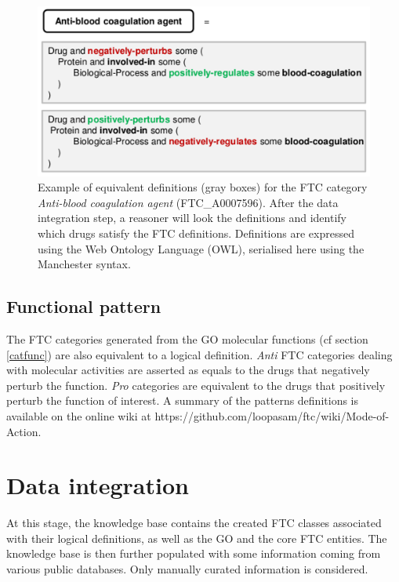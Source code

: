 \documentclass{bioinfo}
\begin{document}
\begin{figure}[!tpb]%
\centerline{\includegraphics{figS1.png}}
\caption{Example of equivalent definitions (gray boxes) for the FTC category \emph{Anti-blood coagulation 
agent} (FTC\_A0007596). After the data integration step, a reasoner will look the definitions and identify 
which drugs satisfy the FTC definitions. Definitions are expressed using the Web Ontology Language (OWL), 
serialised here using the Manchester syntax.}\label{fig:S01}
\end{figure}

\subsection{Functional pattern}
The FTC categories generated from the GO molecular functions (cf section \ref{catfunc}) are also equivalent to a logical 
definition. \emph{Anti} FTC categories dealing with molecular activities are asserted as equals to the drugs 
that negatively perturb the function. \emph{Pro} categories are equivalent to the drugs that positively perturb the 
function of interest. A summary of the patterns definitions is available on the 
online wiki at {{https://github.com/loopasam/ftc/wiki/Mode-of-Action}}.

\section{Data integration}
At this stage, the knowledge base contains the created FTC classes associated with their 
logical definitions, as well as the GO and the core FTC entities. The knowledge base is then 
further populated with some information coming from various public databases. Only manually curated 
information is considered.
\end{document}
